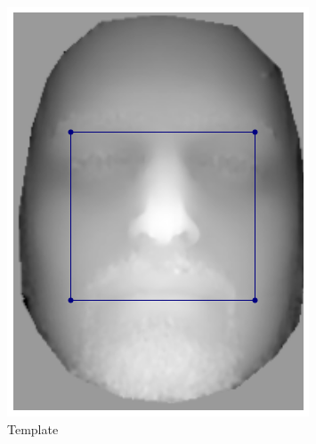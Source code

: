 \begin{figure}[t]
    \centering
    \hspace*{\fill}
    \begin{subfigure}[b]{0.2\textwidth}
        \includegraphics[width=\textwidth]{statistical_normals/images/lk2d/bs004_template.png}
        \caption{Template}\label{subfig:singl_img_depth_2d_lk_template}
    \end{subfigure} \hfill
    \begin{subfigure}[b]{0.2\textwidth}

\end{subfigure}
\end{figure}
